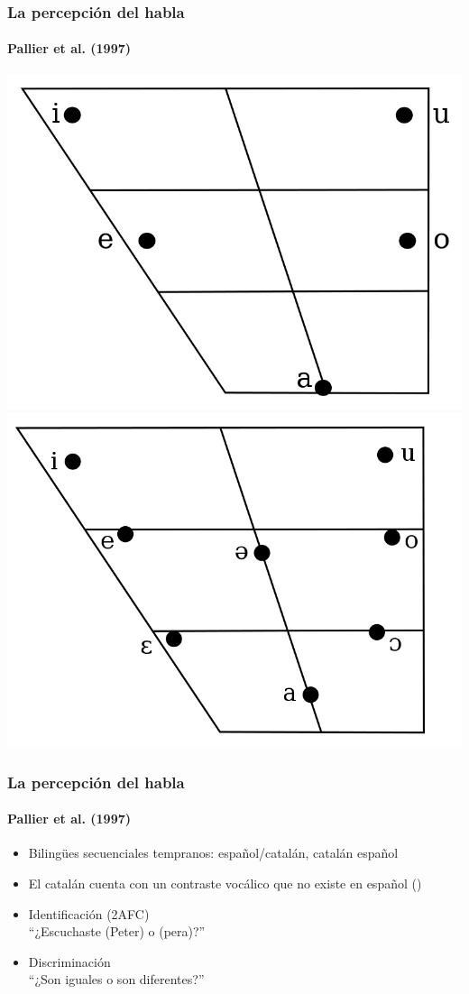 \documentclass{beamer}
\begin{document}
\begin{frame}
	\frametitle{La percepción del habla}
	\framesubtitle{Pallier et al. (1997)}
	
	\begin{center}
		\includegraphics[scale=.2]{figures/spanish.png} \includegraphics[scale=.2]{figures/catalan.png}
	\end{center}
\end{frame}

\begin{frame}
	\frametitle{La percepción del habla}
	\framesubtitle{Pallier et al. (1997)}
	
	\begin{itemize}
		\item Bilingües secuenciales tempranos: español/catalán, catalán español
		\item El catalán cuenta con un contraste vocálico que no existe en español ()
		\item Identificación (2AFC) \\
		``¿Escuchaste  (Peter) o  (pera)?''
		\item Discriminación \\
		``¿Son iguales o son diferentes?''
	\end{itemize}
\end{frame}
\end{document}
